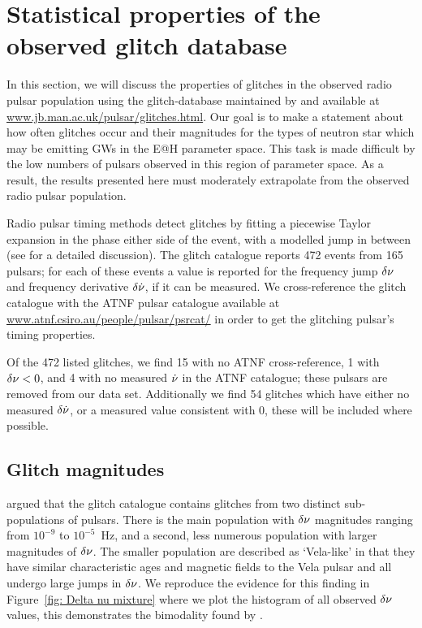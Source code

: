 \documentclass[../full_thesis/full_thesis.tex]{subfiles}
\begin{document}
\section{Statistical properties of the observed glitch database}
\label{sec: statistical properties}
In this section, we will discuss the properties of glitches in the observed
radio pulsar population using the glitch-database maintained by \citet{Espinoza2011}
and available at \url{www.jb.man.ac.uk/pulsar/glitches.html}.
Our goal is to make a statement about how often glitches occur and their
magnitudes for the types of neutron star which may be emitting GWs in the E@H
parameter space. This task is made difficult by the low numbers of pulsars observed
in this region of parameter space. As a result, the results presented here must
moderately extrapolate from the observed radio pulsar population.

Radio pulsar timing methods detect glitches by fitting a piecewise Taylor expansion in
the phase either side of the event, with a modelled jump in between (see
\citet{Edwards2006} for a detailed discussion). The glitch catalogue
\citep{Espinoza2011} reports 472 events from 165 pulsars; for each of these
events a value is reported for the frequency jump $\delta\nu$ and frequency
derivative $\delta\dot{\nu}$, if it can be measured. We
cross-reference the glitch catalogue with the ATNF \citet{ATNF} pulsar
catalogue available at \url{www.atnf.csiro.au/people/pulsar/psrcat/} in order
to get the glitching pulsar's timing properties.

Of the 472 listed glitches, we find 15 with no ATNF cross-reference, 1 with
$\delta\nu < 0$, and 4 with no measured $\dot{\nu}$ in the ATNF catalogue; these
pulsars are removed from our data set. Additionally we find 54 glitches which
have either no measured $\delta\dot{\nu}$, or a measured value consistent with 0,
these will be included where possible.

\subsection{Glitch magnitudes}
\label{sec: observed glitch magnitude}

\citet{Espinoza2011} argued that the glitch catalogue contains glitches from
two distinct sub-populations of pulsars. There is the main population with
$\delta\nu$ magnitudes ranging from $10^{-9}$ to $10^{-5}$~Hz, and a second,
less numerous population with larger magnitudes of $\delta\nu$. The smaller
population are described as `Vela-like' in that they have similar
characteristic ages and magnetic fields to the Vela pulsar and all undergo
large jumps in $\delta\nu$.  We reproduce the evidence for this finding in
Figure~\ref{fig: Delta nu mixture} where we plot the histogram of all observed
$\delta\nu$ values, this demonstrates the bimodality found by \citet{Espinoza2011}.
\end{document}
